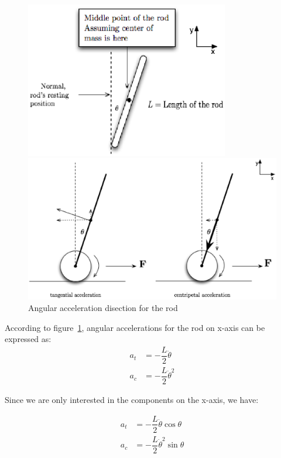 \documentclass{notes}
\begin{document}
\begin{figure}[!h]
  \begin{center}
    \begin{minipage}[b]{3.5in}
      \centerline{\mbox{\includegraphics[width=3.5in]{pics/rod.eps}}}
    \end{minipage}
    \begin{minipage}[b]{3.5in}
      \centerline{\mbox{\includegraphics[width=4.5 in]{pics/rod_acc.eps}}}
    \end{minipage}
    
  \end{center}
  \caption{Angular acceleration disection for the rod}
  \label{fig:angular_rod}
\end{figure}

According to figure~\ref{fig:angular_rod}, angular accelerations for the rod on x-axis can be
expressed as:
\begin{align*}
  a_t & = -\dfrac{L}{2} \ddot{\theta} \\
  a_c & = -\dfrac{L}{2} \dot{\theta}^2
\end{align*}

Since we are only interested in the components on the x-axis, we have:

\begin{align*}
  a_t & = -\dfrac{L}{2} \ddot{\theta} \cos \theta \\
  a_c & = -\dfrac{L}{2} \dot{\theta}^2 \sin \theta
\end{align*}
\end{document}
